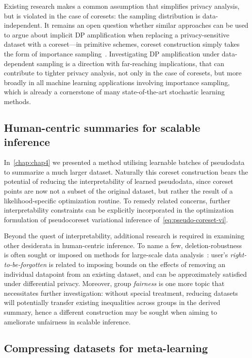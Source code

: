 Existing research makes a common assumption that simplifies privacy analysis, but is violated in the case of coresets: the sampling distribution is data-independent. It remains an open question whether similar approaches can be used to argue about implicit DP amplification when replacing a privacy-sensitive dataset with a coreset---in primitive schemes, coreset construction simply takes the form of importance sampling~\citep{bachem17}. Investigating DP amplification under data-dependent sampling is a direction with far-reaching implications, that can contribute to tighter privacy analysis, not only in the case of coresets, but more broadly in all machine learning applications involving importance sampling, which is already a cornerstone of many state-of-the-art stochastic learning methods. 


\subsection{Human-centric summaries for scalable inference}
\label{subsec:human-centric-pseudodata}

In~\cref{chap:chap4} we presented a method utilising learnable batches of pseudodata to summarize a much larger dataset. Naturally this coreset construction bears the potential of reducing the interpretability of learned pseudodata, since coreset points are now not a subset of the original dataset, but rather the result of a likelihood-specific optimization routine. To remedy related concerns, further interpretability constraints can be explicitly incorporated in the optimization formulation of pseudocoreset variational inference of~\cref{eq:pseudo-coreset-vi}.

Beyond the quest of interpretability, additional research is required in examining other desiderata in human-centric inference. To name a few, deletion-robustness is often sought or imposed on methods for large-scale data analysis~\citep{mirzasoleiman17, ginart19}: user's \emph{right-to-be-forgotten} is related to imposing bounds on the effects of removing an individual datapoint from an existing dataset, and can be approximately satisfied under differential privacy. Moreover, group \emph{fairness} is one more topic that necessitates further investigation: without special treatment, reducing datasets will potentially transfer existing inequalities across groups in the derived summary, hence a different construction may be sought when aiming to ameliorate unfairness in scalable inference.  

\subsection{Compressing datasets for meta-learning}
\label{subsec:metacoresets}

